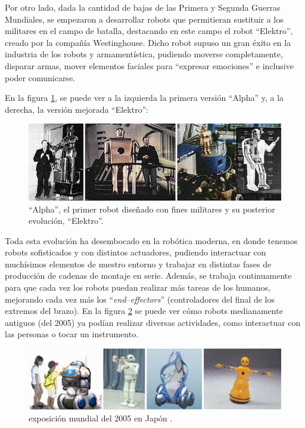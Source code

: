 Por otro lado, dada la cantidad de bajas de las Primera y Segunda Guerras Mundiales, se empezaron a
desarrollar robots que permitieran sustituir a los militares en el campo de batalla, destacando en este
campo el robot ``Elektro'', creado por la compañía Westinghouse. Dicho robot supuso un gran éxito en la
industria de los robots y armamentística, pudiendo moverse completamente, disparar armas, mover elementos
faciales para ``expresar emociones'' e inclusive poder comunicarse.

En la figura \ref{fig:elektro}, se puede ver a la izquierda la primera versión ``Alpha'' y, a la derecha,
la versión mejorada ``Elektro'':

\begin{figure}[H]
    \centering
    \includegraphics[width=.85\linewidth]{pictures/elektro.png}
    \caption{``Alpha'', el primer robot diseñado con fines militares y su posterior evolución, ``Elektro''.}
    \label{fig:elektro}
\end{figure}

Toda esta evolución ha desembocado en la robótica moderna, en donde tenemos robots sofisticados y con
distintos actuadores, pudiendo interactuar con muchísimos elementos de nuestro entorno y trabajar en
distintas fases de producción de cadenas de montaje en serie. Además, se trabaja continuamente para 
que cada vez los robots puedan realizar más tareas de los humanos, mejorando cada vez más los
``\textit{end--effectors}'' (controladores del final de los extremos del brazo). En la figura 
\ref{fig:new_robots} se puede ver cómo robots medianamente antiguos (del 2005) ya podían realizar diversas
actividades, como interactuar con las personas o tocar un instrumento.

\begin{figure}[H]
    \centering
    \includegraphics[width=.75\linewidth]{pictures/expo_japan.png}
    \caption{exposición mundial del 2005 en Japón \cite{belarmino_j_and_moran_me_and_firoozi_f_and_capello_s_and_kolios_e_and_perrotti_m_oriental_2005}.}
    \label{fig:new_robots}
\end{figure}

